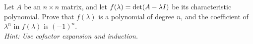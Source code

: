 \begin{question}\label{degree}	\normalfont
Let $A$ be an $n\times n$ matrix, and let $f(\lambda) = \textup{det}(A - \lambda I)$ be its characteristic polynomial. Prove that $f(\lambda)$ is a polynomial of degree $n$, and the coefficient of $\lambda^n$ in $f(\lambda)$ is $(-1)^n$. \\
\emph{Hint: Use cofactor expansion and induction.}	
\end{question}